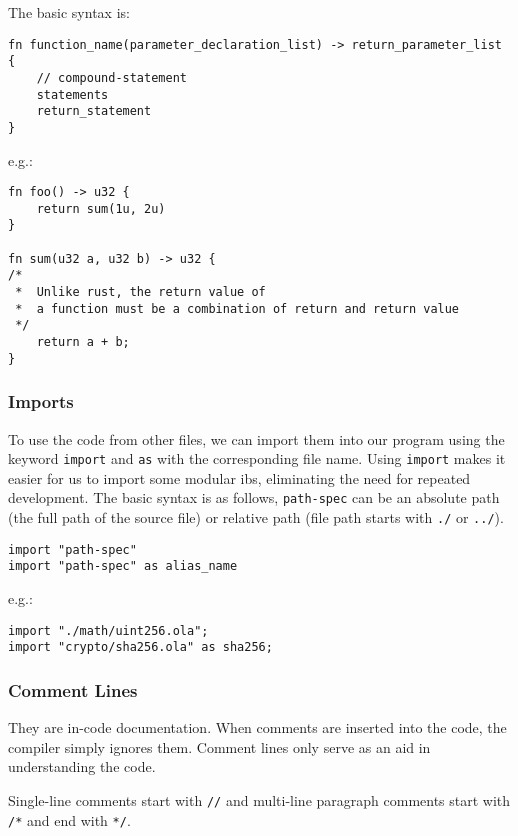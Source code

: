 The basic syntax is:

\begin{lstlisting}
fn function_name(parameter_declaration_list) -> return_parameter_list {
    // compound-statement
    statements
    return_statement
}
\end{lstlisting}

e.g.:

\begin{lstlisting}
fn foo() -> u32 {
    return sum(1u, 2u)
}

fn sum(u32 a, u32 b) -> u32 {
/* 
 *  Unlike rust, the return value of 
 *  a function must be a combination of return and return value
 */
    return a + b;
}
\end{lstlisting}

\subsubsection{Imports}

To use the code from other files, we can import them into our program using the keyword \verb|import| and \verb|as| with the corresponding file name.
Using \verb|import| makes it easier for us to import some modular ibs, eliminating the need for repeated development.
The basic syntax is as follows, \verb|path-spec| can be an absolute path (the full path of the source file) or relative path (file path starts with \verb|./| or \verb|../|).

\begin{lstlisting}
import "path-spec"
import "path-spec" as alias_name
\end{lstlisting}

e.g.:

\begin{lstlisting}
import "./math/uint256.ola";
import "crypto/sha256.ola" as sha256;
\end{lstlisting}

\subsubsection{Comment Lines}

They are in-code documentation. When comments are inserted into the code, the compiler simply ignores them. Comment lines only serve as an aid in understanding the code.

Single-line comments start with \texttt{//} and multi-line paragraph comments start with \texttt{/*} and end with \texttt{*/}.

